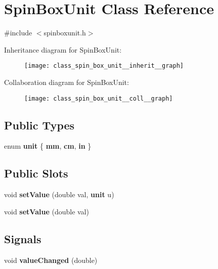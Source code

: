 \section{Spin\+Box\+Unit Class Reference}
\label{class_spin_box_unit}


{\ttfamily \#include $<$spinboxunit.\+h$>$}



Inheritance diagram for Spin\+Box\+Unit\+:\nopagebreak
\begin{figure}[H]
\begin{center}
\leavevmode
\texttt{[image: class\_spin\_box\_unit\_\_inherit\_\_graph]}
\end{center}
\end{figure}


Collaboration diagram for Spin\+Box\+Unit\+:\nopagebreak
\begin{figure}[H]
\begin{center}
\leavevmode
\texttt{[image: class\_spin\_box\_unit\_\_coll\_\_graph]}
\end{center}
\end{figure}
\subsection*{Public Types}
\begin{DoxyCompactItemize}
\item 
enum \textbf{ unit} \{ \textbf{ mm}, 
\textbf{ cm}, 
\textbf{ in}
 \}
\end{DoxyCompactItemize}
\subsection*{Public Slots}
\begin{DoxyCompactItemize}
\item 
void \textbf{ set\+Value} (double val, \textbf{ unit} u)
\item 
void \textbf{ set\+Value} (double val)
\end{DoxyCompactItemize}
\subsection*{Signals}
\begin{DoxyCompactItemize}
\item 
void \textbf{ value\+Changed} (double)
\end{DoxyCompactItemize}
